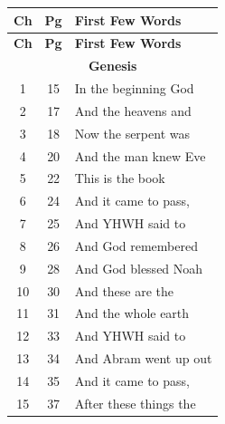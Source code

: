 \documentclass{article}
\newlength{\minipageheight}
\newlength{\minipagewidth}
\begin{document}
%
%
\begin{minipage}[l][\minipageheight][t]{\minipagewidth}%
    \begin{longtable}{ccl}%
        \textbf{Ch} & \textbf{Pg}  & \textbf{First Few Words}         \\%
        \hline%
        \endfirsthead%
        \textbf{Ch} & \textbf{Pg}  & \textbf{First Few Words}         \\%
        \hline%
        \endhead%

        \multicolumn{3}{c}{\textbf{Genesis}}                          \\%
        \hline
        1           & 15           & In the beginning God             \\
        2           & 17           & And the heavens and              \\
        3           & 18           & Now the serpent was              \\
        4           & 20           & And the man knew Eve             \\
        5           & 22           & This is the book                 \\
        6           & 24           & And it came to pass,             \\
        7           & 25           & And YHWH said to                 \\
        8           & 26           & And God remembered               \\%
        9           & 28           & And God blessed Noah             \\
        10          & 30           & And these are the                \\
        11          & 31           & And the whole earth              \\
        12          & 33           & And YHWH said to                 \\
        13          & 34           & And Abram went up out            \\
        14          & 35           & And it came to pass,             \\
        15          & 37           & After these things the           \\

\end{longtable}
\end{minipage}
\end{document}
